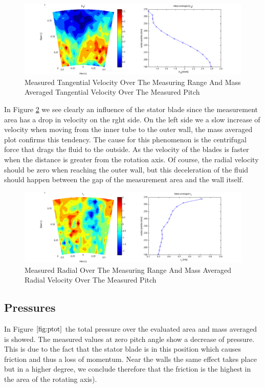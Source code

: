 \begin{figure}[H]
\centering
\includegraphics[trim = 110px 0px 80px 0px, clip = true,width=\textwidth]{pics/vtheta.png}
\caption{Measured Tangential Velocity Over The Measuring Range And Mass Averaged Tangential Velocity Over The Measured Pitch}
\label{fig:v_theta}
\end{figure}

In Figure \ref{fig:v_r} we see clearly an influence of the stator blade since the measurement area has a drop in velocity on the rght side. On the left side we a slow increase of velocity when moving from the inner tube to the outer wall, the mass averaged plot confirms this tendency. The cause for this phenomenon is the centrifugal force that drags the fluid to the outside. As the velocity of the blades is faster when the distance is greater from the rotation axis. Of course, the radial velocity should be zero when reaching the outer wall, but this deceleration of the fluid should happen between the gap of the measurement area and the wall itself.

\begin{figure}[H]
\centering
\includegraphics[trim = 110px 0px 80px 0px, clip = true,width=\textwidth]{pics/vr.png}
\caption{Measured Radial Over The Measuring Range And Mass Averaged Radial Velocity Over The Measured Pitch}
\label{fig:v_r}
\end{figure}

\subsection{Pressures}

In Figure $\ref{fig:ptot}$ the total pressure over the evaluated area and mass averaged is showed. The measured values at zero pitch angle show a decrease of pressure. This is due to the fact that the stator blade is in this position which causes friction and thus a loss of momentum. Near the walls the same effect takes place but in a higher degree, we conclude therefore that the friction is the highest in the area of the rotating axis).\\

